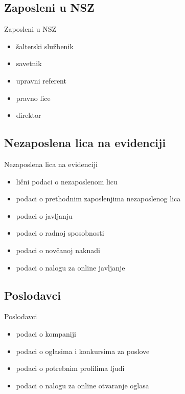 \documentclass[11pt]{beamer}
\begin{document}
\subsection{Zaposleni u NSZ}
\begin{frame}{Zaposleni u NSZ}
	\begin{itemize}
		\item \v salterski slu\v zbenik
		\item savetnik
		\item upravni referent
		\item pravno lice
		\item direktor
	\end{itemize}

\end{frame}
	
\subsection{Nezaposlena lica na evidenciji}
\begin{frame}{Nezaposlena lica na evidenciji}
	\begin{itemize}
		\item  li\v cni podaci o nezaposlenom licu
		\item podaci o prethodnim zaposlenjima nezaposlenog lica
		\item podaci o javljanju
		\item podaci o radnoj sposobnosti
		\item podaci o nov\v canoj naknadi 
		\item podaci o nalogu za online javljanje
	\end{itemize}
\end{frame}	
	
\subsection{Poslodavci}
\begin{frame}{Poslodavci}
		\begin{itemize}
			\item podaci o kompaniji
			\item podaci o oglasima i konkursima za poslove
			\item podaci o potrebnim profilima ljudi
			\item podaci o nalogu za online otvaranje oglasa
		\end{itemize}
	\end{frame}	
\end{document}
